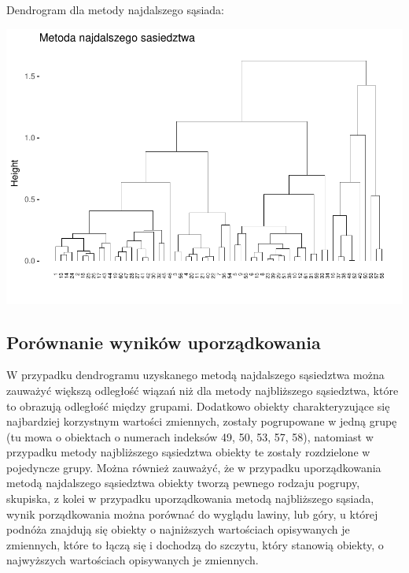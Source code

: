 \documentclass[12pt,a4paper]{report}
\begin{document}
{Dendrogram dla metody najdalszego sąsiada:

\begin{Shaded}
\begin{Highlighting}[]
\NormalTok{, }\NormalTok{, } \NormalTok{)}
\end{Highlighting}
\end{Shaded}

\includegraphics{Metoda_nieliniowa_duzy_files/figure-latex/unnamed-chunk-10-1.pdf}

\subsection{Porównanie wyników
uporządkowania}\label{porownanie-wynikow-uporzadkowania}

W przypadku dendrogramu uzyskanego metodą najdalszego sąsiedztwa można
zauważyć większą odległość wiązań niż dla metody najbliższego
sąsiedztwa, które to obrazują odległość między grupami. Dodatkowo
obiekty charakteryzujące się najbardziej korzystnym wartości zmiennych,
zostały pogrupowane w jedną grupę (tu mowa o obiektach o numerach
indeksów 49, 50, 53, 57, 58), natomiast w przypadku metody najbliższego
sąsiedztwa obiekty te zostały rozdzielone w pojedyncze grupy. Można
również zauważyć, że w przypadku uporządkowania metodą najdalszego
sąsiedztwa obiekty tworzą pewnego rodzaju pogrupy, skupiska, z kolei w
przypadku uporządkowania metodą najbliższego sąsiada, wynik
porządkowania można porównać do wyglądu lawiny, lub góry, u której
podnóża znajdują się obiekty o najniższych wartościach opisywanych je
zmiennych, które to łączą się i dochodzą do szczytu, który stanowią
obiekty, o najwyższych wartościach opisywanych je zmiennych.


}









\end{document}
